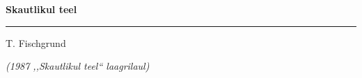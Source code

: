 \documentclass[12pt]{extbook}
\begin{document}
{
  \samepage
  \raggedbottom
  \raggedright
  \sloppy


  \vspace{0.2in}
    \centerline{
      \bfseries
      \large Skautlikul teel
    }
  \nopagebreak[4]
  \vspace{0.1in}
  \nopagebreak[4]
  \hrule height 0.05ex
  \nopagebreak[4]
  \vspace{-0.05in}

  {\footnotesize  \hfill T. Fischgrund }\\
  \vspace{0.01in}

  {\em {\footnotesize (1987 ,,Skautlikul teel{``} laagrilaul) } }
  \vspace{0.01in}


}
\end{document}
